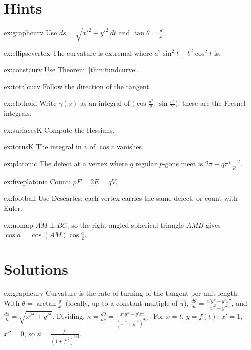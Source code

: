 \section{Hints}

\begin{hint}{ex:graphcurv}
Use $ds=\sqrt{x'^2+y'^2}\,dt$ and $\tan\theta=\frac{y'}{x'}$.
\end{hint}
\begin{hint}{ex:ellipsevertex}
The curvature is extremal where $a^2\sin^2t+b^2\cos^2t$ is.
\end{hint}
\begin{hint}{ex:constcurv}
Use Theorem~\ref{thm:fundcurve}.
\end{hint}
\begin{hint}{ex:totalcurv}
Follow the direction of the tangent.
\end{hint}
\begin{hint}{ex:clothoid}
Write $\gamma(s)$ as an integral of $\bigl(\cos\frac{u^2}2,\sin\frac{u^2}2\bigr)$: these are the Fresnel integrals.
\end{hint}
\begin{hint}{ex:surfacesK}
Compute the Hessians.
\end{hint}
\begin{hint}{ex:torusK}
The integral in $v$ of $\cos v$ vanishes.
\end{hint}
\begin{hint}{ex:platonic}
The defect at a vertex where $q$ regular $p$-gons meet is $2\pi-q\pi\frac{p-2}p$.
\end{hint}
\begin{hint}{ex:fiveplatonic}
Count: $pF=2E=qV$.
\end{hint}
\begin{hint}{ex:football}
Use Descartes: each vertex carries the same defect, or count with Euler.
\end{hint}
\begin{hint}{ex:nomap}
$AM\perp BC$, so the right-angled spherical triangle $AMB$ gives $\cos a=\cos(AM)\cos\frac a2$.
\end{hint}

\section{Solutions}

\begin{solution}{ex:graphcurv}
\idea Curvature is the rate of turning of the tangent per unit length.
\writeup With $\theta=\arctan\frac{y'}{x'}$ (locally, up to a constant multiple of $\pi$), $\frac{d\theta}{dt}=\frac{x'y''-y'x''}{x'^2+y'^2}$, and $\frac{ds}{dt}=\sqrt{x'^2+y'^2}$.
Dividing, $\kappa=\frac{d\theta}{ds}=\frac{x'y''-y'x''}{(x'^2+y'^2)^{3/2}}$. For $x=t$, $y=f(t)$: $x'=1$, $x''=0$, so $\kappa=\frac{f''}{(1+f'^2)^{3/2}}$.
\end{solution}

